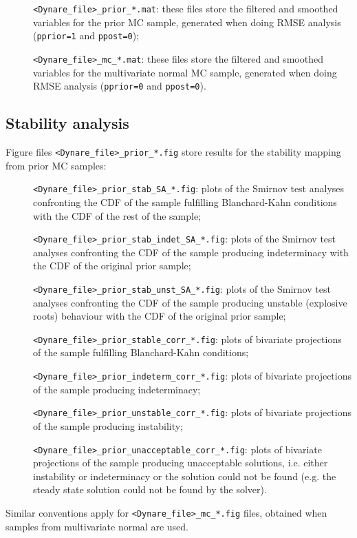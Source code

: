 \documentclass[12pt,a4paper]{article}
\begin{document}
\begin{description}
\item[]\verb"<Dynare_file>_prior_*.mat": these files store
the filtered and smoothed variables for the prior MC sample,
generated when doing  RMSE analysis (\verb"pprior=1" and
\verb"ppost=0");
\item[]\verb"<Dynare_file>_mc_*.mat": these files store
the filtered and smoothed variables for the multivariate normal MC
sample, generated when doing  RMSE analysis (\verb"pprior=0" and
\verb"ppost=0").
\end{description}

\subsection{Stability analysis}
Figure files \verb"<Dynare_file>_prior_*.fig" store results for
the stability mapping from prior MC samples:
\begin{description}
\item[]\verb"<Dynare_file>_prior_stab_SA_*.fig": plots of the Smirnov
test analyses confronting the CDF of the sample fulfilling
Blanchard-Kahn conditions with the CDF of the rest of the sample;
\item[]\verb"<Dynare_file>_prior_stab_indet_SA_*.fig": plots of the Smirnov
test analyses confronting the CDF of the sample producing
indeterminacy with the CDF of the original prior sample;
\item[]\verb"<Dynare_file>_prior_stab_unst_SA_*.fig": plots of the Smirnov
test analyses confronting the CDF of the sample producing unstable
(explosive roots) behaviour with the CDF of the original prior
sample;
\item[]\verb"<Dynare_file>_prior_stable_corr_*.fig": plots of
bivariate projections of the sample fulfilling Blanchard-Kahn
conditions;
\item[]\verb"<Dynare_file>_prior_indeterm_corr_*.fig": plots of
bivariate projections of the sample producing indeterminacy;
\item[]\verb"<Dynare_file>_prior_unstable_corr_*.fig":  plots of
bivariate projections of the sample producing instability;
\item[]\verb"<Dynare_file>_prior_unacceptable_corr_*.fig": plots of
bivariate projections of the sample producing unacceptable
solutions, i.e. either instability or indeterminacy or the
solution could not be found (e.g. the steady state solution could
not be found by the solver).
\end{description}
Similar conventions apply for \verb"<Dynare_file>_mc_*.fig" files,
obtained when samples from multivariate normal are used.
\end{document}
